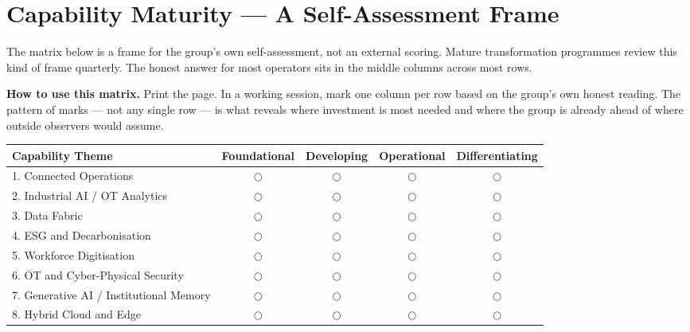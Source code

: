 \documentclass[10pt]{article}
\newcommand{\spacer}{\vspace{10pt}}
\newcommand{\bigspacer}{\vspace{16pt}}
\begin{document}
\bigspacer

\section{Capability Maturity --- A Self-Assessment Frame}

The matrix below is a frame for the group's own self-assessment, not an
external scoring. Mature transformation programmes review this kind of frame
quarterly. The honest answer for most operators sits in the middle columns
across most rows.

\spacer

{\small\color{darkgrey}
\textbf{How to use this matrix.}\enspace
Print the page. In a working session, mark one column per row based on the
group's own honest reading. The pattern of marks --- not any single row ---
is what reveals where investment is most needed and where the group is
already ahead of where outside observers would assume.
}

\spacer
\small
\begin{tabularx}{\columnwidth}{@{}lcccc@{}}
\toprule
\textbf{Capability Theme} & \textbf{Foundational} & \textbf{Developing} & \textbf{Operational} & \textbf{Differentiating} \\
\midrule
1. Connected Operations              & $\bigcirc$ & $\bigcirc$ & $\bigcirc$ & $\bigcirc$ \\
2. Industrial AI / OT Analytics      & $\bigcirc$ & $\bigcirc$ & $\bigcirc$ & $\bigcirc$ \\
3. Data Fabric                       & $\bigcirc$ & $\bigcirc$ & $\bigcirc$ & $\bigcirc$ \\
4. ESG and Decarbonisation           & $\bigcirc$ & $\bigcirc$ & $\bigcirc$ & $\bigcirc$ \\
5. Workforce Digitisation            & $\bigcirc$ & $\bigcirc$ & $\bigcirc$ & $\bigcirc$ \\
6. OT and Cyber-Physical Security    & $\bigcirc$ & $\bigcirc$ & $\bigcirc$ & $\bigcirc$ \\
7. Generative AI / Institutional Memory & $\bigcirc$ & $\bigcirc$ & $\bigcirc$ & $\bigcirc$ \\
8. Hybrid Cloud and Edge             & $\bigcirc$ & $\bigcirc$ & $\bigcirc$ & $\bigcirc$ \\
\bottomrule
\end{tabularx}
\normalsize
\end{document}
